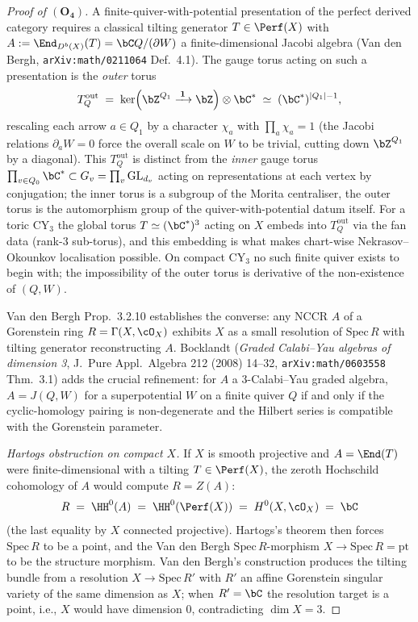 \begin{proof}[Proof of $(\mathbf{O_4})$]
A finite-quiver-with-potential presentation of the perfect derived
category requires a classical tilting generator $T \in \Perf(X)$ with
$A := \End_{D^b(X)}(T) = \bC Q / (\partial W)$ a finite-dimensional
Jacobi algebra (Van den Bergh, \texttt{arXiv:math/0211064} Def.~4.1).
The gauge torus acting on such a presentation is the \emph{outer} torus
\[
 T^{\mathrm{out}}_Q \;=\; \ker\!\left(
 \bZ^{Q_1} \xrightarrow{\;\mathbf 1\;} \bZ\right) \otimes \bC^\ast
 \;\simeq\; (\bC^\ast)^{|Q_1| - 1},
\]
rescaling each arrow $a \in Q_1$ by a character $\chi_a$ with
$\prod_a \chi_a = 1$ (the Jacobi relations $\partial_a W = 0$ force
the overall scale on $W$ to be trivial, cutting down $\bZ^{Q_1}$ by a
diagonal). This $T^{\mathrm{out}}_Q$ is distinct from the \emph{inner}
gauge torus $\prod_{v \in Q_0} \bC^\ast \subset G_v =
\prod_v \mathrm{GL}_{d_v}$ acting on representations at each vertex by
conjugation; the inner torus is a subgroup of the Morita centraliser,
the outer torus is the automorphism group of the quiver-with-potential
datum itself. For a toric CY$_3$ the global torus $T \simeq (\bC^\ast)^3$
acting on $X$ embeds into $T^{\mathrm{out}}_Q$ via the fan data
(rank-$3$ sub-torus), and this embedding is what makes chart-wise
Nekrasov--Okounkov localisation possible. On compact CY$_3$ no such
finite quiver exists to begin with; the impossibility of the outer
torus is derivative of the non-existence of $(Q, W)$.

Van den Bergh Prop.~3.2.10 establishes the converse: any NCCR $A$ of a
Gorenstein ring $R = \Gamma(X, \cO_X)$ exhibits $X$ as a small
resolution of $\mathrm{Spec}\,R$ with tilting generator reconstructing
$A$. Bocklandt (\emph{Graded Calabi--Yau algebras of dimension 3},
J.\ Pure Appl.\ Algebra 212 (2008) 14--32,
\texttt{arXiv:math/0603558} Thm.~3.1) adds the crucial refinement: for
$A$ a $3$-Calabi--Yau graded algebra, $A = J(Q, W)$ for a superpotential
$W$ on a finite quiver $Q$ if and only if the cyclic-homology pairing
is non-degenerate and the Hilbert series is compatible with the
Gorenstein parameter.

\emph{Hartogs obstruction on compact $X$.}
If $X$ is smooth projective and $A = \End(T)$ were finite-dimensional
with a tilting $T \in \Perf(X)$, the zeroth Hochschild cohomology of
$A$ would compute $R = Z(A)$:
\[
 R \;=\; \HH^0(A) \;=\; \HH^0(\Perf(X)) \;=\; H^0(X, \cO_X) \;=\; \bC
\]
(the last equality by $X$ connected projective). Hartogs's theorem then
forces $\mathrm{Spec}\,R$ to be a point, and the Van den Bergh
$\mathrm{Spec}\,R$-morphism $X \to \mathrm{Spec}\,R = \mathrm{pt}$ to
be the structure morphism. Van den Bergh's construction produces the
tilting bundle from a resolution $X \to \mathrm{Spec}\,R'$ with $R'$
an affine Gorenstein singular variety of the same dimension as $X$;
when $R' = \bC$ the resolution target is a point, i.e., $X$ would have
dimension $0$, contradicting $\dim X = 3$.


\end{proof}
